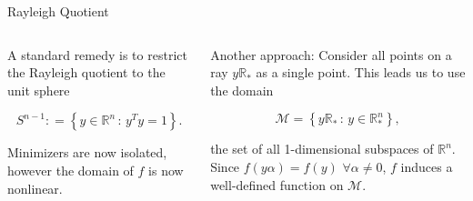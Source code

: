 \documentclass[xcolor=dvipsnames,t]{beamer} %
\newcommand{\reals}{\mathbb{R}}
\newcommand{\defeq}{\mathrel{\mathop:}=}
\begin{document}
\begin{frame}{Rayleigh Quotient}
   \begin{columns}
      \begin{column}{0.5\textwidth}
   A standard remedy is to restrict the Rayleigh quotient to the unit sphere

   \[ S^{n-1}\defeq \left\{y\in\reals^n \,:\, y^Ty=1\right\}. \]
   
   \noindent Minimizers are now isolated, however the domain of $f$ is now nonlinear.\\[.5em]

   
   \begin{center}
      ~\\[1.45em] %
      \color{red}{Embedded submanifold}
   \end{center}
      \end{column}

      \begin{column}{0.5\textwidth}
   Another approach: Consider all points on a ray $y\reals_\ast$ as a single point.  This leads us to use the domain

   \[ \mathcal{M} = \left\{y\reals_\ast \,:\, y\in\reals^n_\ast\right\}, \] 

   \noindent the set of all 1-dimensional subspaces of $\reals^n$.\\[.5em]
   
   Since $f(y\alpha)=f(y)$ $\forall \alpha \neq 0$, $f$ induces a well-defined function on $\mathcal{M}$.

   \begin{center}
      \color{red}{Quotient manifold}
   \end{center}
      \end{column}
   \end{columns}
\end{frame}

\end{document}
